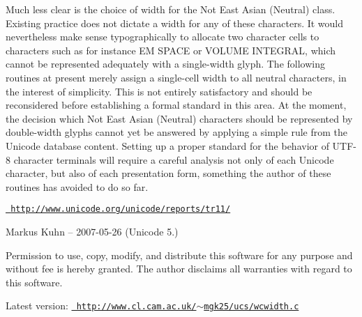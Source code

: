 Much less clear is the choice of width for the Not East Asian (Neutral) class. Existing practice does not dictate a width for any of these characters. It would nevertheless make sense typographically to allocate two character cells to characters such as for instance EM SPACE or VOLUME INTEGRAL, which cannot be represented adequately with a single-\/width glyph. The following routines at present merely assign a single-\/cell width to all neutral characters, in the interest of simplicity. This is not entirely satisfactory and should be reconsidered before establishing a formal standard in this area. At the moment, the decision which Not East Asian (Neutral) characters should be represented by double-\/width glyphs cannot yet be answered by applying a simple rule from the Unicode database content. Setting up a proper standard for the behavior of UTF-\/8 character terminals will require a careful analysis not only of each Unicode character, but also of each presentation form, something the author of these routines has avoided to do so far.

\href{http://www.unicode.org/unicode/reports/tr11/}{\texttt{ http\+://www.\+unicode.\+org/unicode/reports/tr11/}}

Markus Kuhn -- 2007-\/05-\/26 (Unicode 5.)

Permission to use, copy, modify, and distribute this software for any purpose and without fee is hereby granted. The author disclaims all warranties with regard to this software.

Latest version\+: \href{http://www.cl.cam.ac.uk/~mgk25/ucs/wcwidth.c}{\texttt{ http\+://www.\+cl.\+cam.\+ac.\+uk/\texorpdfstring{$\sim$}{\string~}mgk25/ucs/wcwidth.\+c}} 
